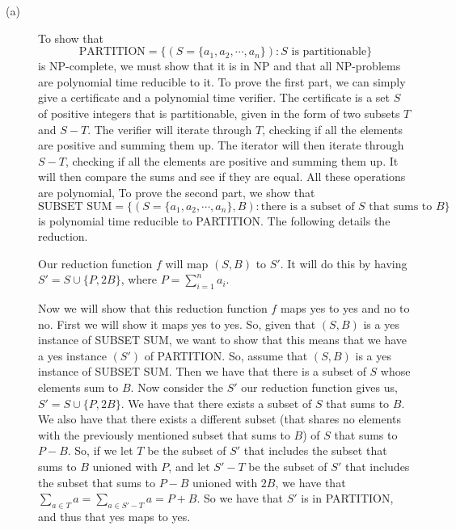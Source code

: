 \documentclass{article}
\begin{document}
\begin{description}
    \item[(a)] To show that
        \[ \text{PARTITION} = \{(S = \{a_1, a_2, \cdots , a_n\}) : S \text{ is
        partitionable}\} \]
         is NP-complete, we must show that it is in NP and that all NP-problems
         are polynomial time reducible to it. To prove the first part, we can
         simply give a certificate and a polynomial time verifier. The
         certificate is a set $S$ of positive integers that is partitionable,
         given in the form of two subsets $T$ and $S-T$. The verifier will iterate
         through $T$, checking if all the elements are positive and summing them
         up. The iterator will then iterate through $S-T$, checking if all the
         elements are positive and summing them up. It will then compare the
         sums and see if they are equal. All these operations are polynomial,
         To prove the second part, we show that
         \[ \text{SUBSET SUM} = \{(S = \{a_1, a_2, \cdots , a_n\}, B) : \text{
         there is a subset of $S$ that sums to $B$}\} \]
         is polynomial time reducible to PARTITION. The following details the
         reduction.

         Our reduction function $f$ will map $(S,B)$ to $S'$. It will do this
         by having $S' = S \cup \{P, 2B\}$, where $P = \sum_{i=1}^{n} a_i$.

         Now we will show that this reduction function $f$ maps yes to yes and
         no to no. First we will show it maps yes to yes. So, given that
         $(S,B)$ is a yes instance of SUBSET SUM, we want to show that this
         means that we have a yes instance $(S')$ of PARTITION. So, assume that
         $(S,B)$ is a yes instance of SUBSET SUM. Then we have that there is
         a subset of $S$ whose elements sum to $B$.
         Now consider the $S'$ our reduction function gives us,
         $S' = S \cup \{P, 2B\}$. We have that there exists a subset of $S$
         that sums to $B$. We also have that there exists a different
         subset (that shares no elements with the previously mentioned subset
         that sums to $B$) of $S$ that sums to $P-B$. So, if we let $T$ be the subset of
         $S'$ that includes the subset that sums to $B$ unioned with $P$,
         and let $S'-T$ be the
         subset of $S'$ that includes the subset that sums to $P-B$ unioned with $2B$,
         we have that $\sum_{a \in T} a = \sum_{a \in S' - T} a = P + B$. So we
         have that $S'$ is in PARTITION, and thus that yes maps to yes.


\end{description}
\end{document}
